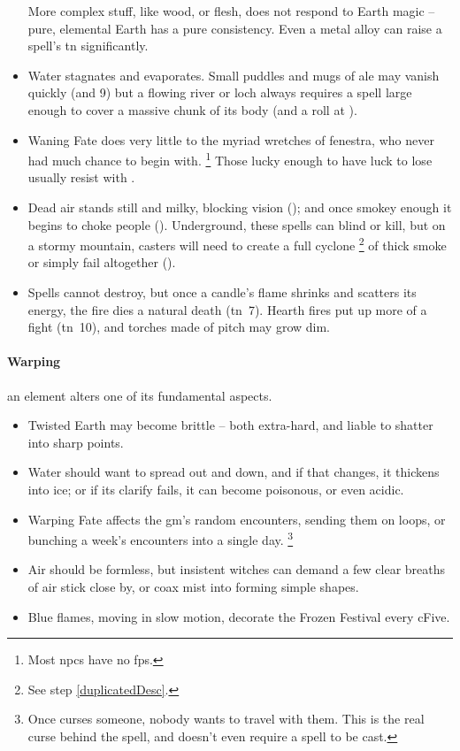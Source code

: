\begin{multicols}{2}
\begin{itemize}
  More complex stuff, like wood, or flesh, does not respond to Earth magic -- pure, elemental Earth has a pure consistency.
  Even a metal alloy can raise a spell's \gls{tn} significantly.
  \item
  Water stagnates and evaporates.
  Small puddles and mugs of ale may vanish quickly (\tn[6] and 9)
  but a flowing river or loch always requires a spell large enough to cover a massive chunk of its body (and a roll at \tn[12]).
  \item
  Waning Fate does very little to the myriad wretches of \gls{fenestra}, who never had much chance to begin with.%
  \footnote{Most \glspl{npc} have no \glspl{fp}.}
  Those lucky enough to have luck to lose usually resist with .
  \item
  Dead air stands still and milky, blocking vision (\tn[7]);
  and once smokey enough it begins to choke people (\tn[9]).
  Underground, these spells can blind or kill, but on a stormy mountain, casters will need to create a full cyclone%
  \footnote{See step \vref{duplicatedDesc}.}
  of thick smoke or simply fail altogether (\tn[16]).
  \item
  Spells cannot destroy, but once a candle's flame shrinks and scatters its energy, the fire dies a natural death (\gls{tn}~7).
  Hearth fires put up more of a fight (\gls{tn}~10), and torches made of pitch may grow dim.
\end{itemize}

\paragraph{Warping}
an element alters one of its fundamental aspects.

\begin{itemize}
  \item
  Twisted Earth may become brittle -- both extra-hard, and liable to shatter into sharp points.
  \item
  Water should want to spread out and down, and if that changes, it thickens into ice;
  or if its clarify fails, it can become poisonous, or even acidic.
  \item
  Warping Fate affects the \gls{gm}'s random encounters, sending them on loops, or bunching a week's encounters into a single day.%
  \footnote{Once  curses someone, nobody wants to travel with them.  This is the real curse behind the spell, and doesn't even require a spell to be cast.}
  \item
  Air should be formless, but insistent witches can demand a few clear breaths of air stick close by, or coax mist into forming simple shapes.
  \item
  Blue flames, moving in slow motion, decorate the Frozen Festival every \gls{cFive}.
\end{itemize}


\end{multicols}
